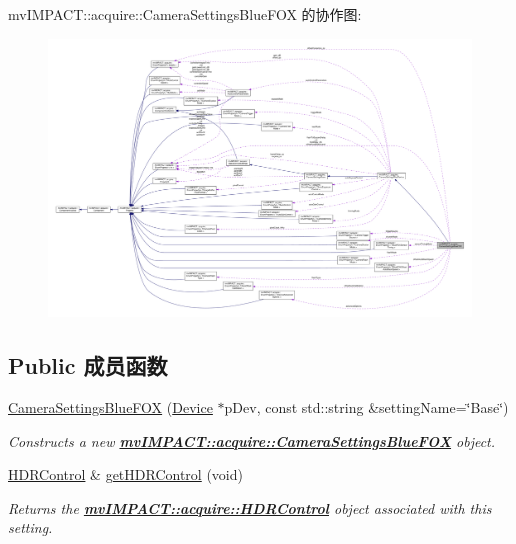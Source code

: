 mv\+I\+M\+P\+A\+C\+T\+:\+:acquire\+:\+:Camera\+Settings\+Blue\+F\+O\+X 的协作图\+:
\nopagebreak
\begin{figure}[H]
\begin{center}
\leavevmode
\includegraphics[width=350pt]{classmv_i_m_p_a_c_t_1_1acquire_1_1_camera_settings_blue_f_o_x__coll__graph}
\end{center}
\end{figure}
\subsection*{Public 成员函数}
\begin{DoxyCompactItemize}
\item 
\hyperlink{classmv_i_m_p_a_c_t_1_1acquire_1_1_camera_settings_blue_f_o_x_acd1731450b9b16c03b4de2748a00d801}{Camera\+Settings\+Blue\+F\+O\+X} (\hyperlink{classmv_i_m_p_a_c_t_1_1acquire_1_1_device}{Device} $\ast$p\+Dev, const std\+::string \&setting\+Name=\char`\"{}Base\char`\"{})
\begin{DoxyCompactList}\small\item\em Constructs a new {\bfseries \hyperlink{classmv_i_m_p_a_c_t_1_1acquire_1_1_camera_settings_blue_f_o_x}{mv\+I\+M\+P\+A\+C\+T\+::acquire\+::\+Camera\+Settings\+Blue\+F\+O\+X}} object. \end{DoxyCompactList}\item 
\hypertarget{classmv_i_m_p_a_c_t_1_1acquire_1_1_camera_settings_blue_f_o_x_a141d3c1944245f8097e805dfbf75c9bd}{\hyperlink{classmv_i_m_p_a_c_t_1_1acquire_1_1_h_d_r_control}{H\+D\+R\+Control} \& \hyperlink{classmv_i_m_p_a_c_t_1_1acquire_1_1_camera_settings_blue_f_o_x_a141d3c1944245f8097e805dfbf75c9bd}{get\+H\+D\+R\+Control} (void)}\label{classmv_i_m_p_a_c_t_1_1acquire_1_1_camera_settings_blue_f_o_x_a141d3c1944245f8097e805dfbf75c9bd}

\begin{DoxyCompactList}\small\item\em Returns the {\bfseries \hyperlink{classmv_i_m_p_a_c_t_1_1acquire_1_1_h_d_r_control}{mv\+I\+M\+P\+A\+C\+T\+::acquire\+::\+H\+D\+R\+Control}} object associated with this setting. \end{DoxyCompactList}\end{DoxyCompactItemize}
